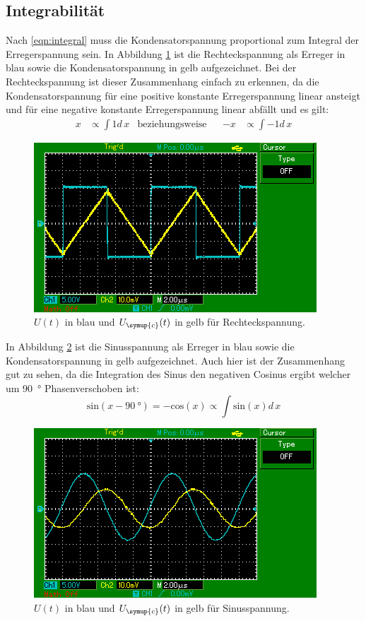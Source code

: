 \subsection{Integrabilität}
Nach \eqref{eqn:integral} muss die Kondensatorspannung proportional zum
Integral der Erregerspannung sein. In Abbildung \ref{fig:int_recht}
ist die Rechteckspannung als Erreger in blau sowie die
Kondensatorspannung in gelb aufgezeichnet. Bei der Rechteckspannung ist dieser
Zusammenhang einfach zu erkennen, da die Kondensatorspannung für eine
positive konstante Erregerspannung linear ansteigt und für eine
negative konstante Erregerspannung linear abfällt und es gilt:
\begin{align}
  x &\propto \int 1 d\, x &\text{beziehungsweise}&& -x &\propto \int -1 d\, x
\end{align}
\begin{figure}[H]
  \centering
  \includegraphics{content/images/d/rechteck.png}
  \caption{$U(t)$ in blau und $U_\symup{c}(t)$ in gelb für Rechteckspannung.}
  \label{fig:int_recht}
\end{figure}
In Abbildung \ref{fig:int_sin}
ist die Sinusspannung als Erreger in blau sowie die
Kondensatorspannung in gelb aufgezeichnet. Auch hier ist der Zusammenhang
gut zu sehen, da die Integration des Sinus den negativen Cosinus ergibt
welcher um \SI{90}{\degree} Phasenverschoben ist:
\begin{equation}
  \text{sin}(x-\SI{90}{\degree})=-\text{cos}(x) \propto \int \text{sin}(x)d\, x
\end{equation}
\begin{figure}[H]
  \centering
  \includegraphics{content/images/d/sinus.png}
  \caption{$U(t)$ in blau und $U_\symup{c}(t)$ in gelb für Sinusspannung.}
  \label{fig:int_sin}
\end{figure}
